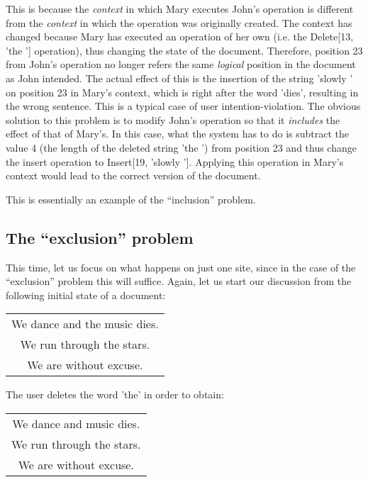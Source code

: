 This is because the \emph{context} in which Mary executes John's operation is different
from the \emph{context} in which the operation was originally created. The context has
changed because Mary has executed an operation of her own (i.e. the Delete[13, 'the ']
operation), thus changing the state of the document. Therefore, position 23 from John's
operation no longer refers the same \emph{logical} position in the document as John
intended. The actual effect of this is the insertion of the string 'slowly ' on
position 23 in Mary's context, which is right after the word 'dies', resulting in the
wrong sentence. This is a typical case of user intention-violation. The obvious solution
to this problem is to modify John's operation so that it \emph{includes} the effect
of that of Mary's. In this case, what the system has to do is subtract the value 4
(the length of the deleted string 'the ') from position 23 and thus change the insert
operation to Insert[19, 'slowly ']. Applying this operation in Mary's context would
lead to the correct version of the document. 

This is essentially an example of the ``inclusion'' problem.

\subsection{The ``exclusion'' problem}

This time, let us focus on what happens on just one site, since in the case of the
``exclusion'' problem this will suffice. Again, let us start our discussion from the
following initial state of a document:

\begin{center}
\begin{tabular}[c]{|c|}
\hline
We dance and the music dies.\\
We run through the stars.\\
We are without excuse.\\
\hline
\end{tabular}
\end{center}

The user deletes the word 'the' in order to obtain:

\begin{center}
\begin{tabular}[c]{|c|}
\hline
We dance and music dies.\\
We run through the stars.\\
We are without excuse.\\
\hline
\end{tabular}
\end{center}

